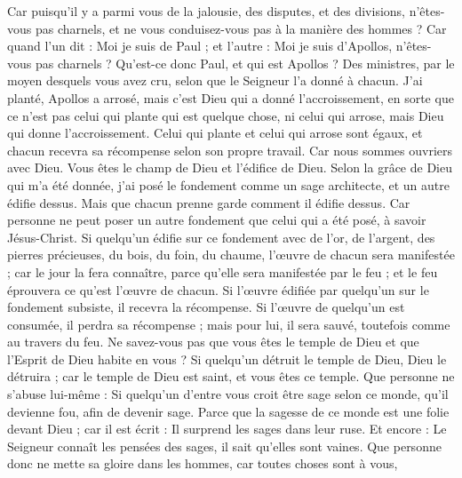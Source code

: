 \begin{multicols}{2}
Car puisqu'il y a parmi vous de la jalousie, des disputes, et des divisions, n'êtes-vous pas charnels, et ne vous conduisez-vous pas à la manière des hommes ?
Car quand l'un dit : Moi je suis de Paul ; et l'autre : Moi je suis d'Apollos, n'êtes-vous pas charnels ?
Qu’est-ce donc Paul, et qui est Apollos ? Des ministres, par le moyen desquels vous avez cru, selon que le Seigneur l’a donné à chacun.
J'ai planté, Apollos a arrosé, mais c'est Dieu qui a donné l'accroissement,
en sorte que ce n’est pas celui qui plante qui est quelque chose, ni celui qui arrose, mais Dieu qui donne l'accroissement.
Celui qui plante et celui qui arrose sont égaux, et chacun recevra sa récompense selon son propre travail.
Car nous sommes ouvriers avec Dieu. Vous êtes le champ de Dieu et l'édifice de Dieu.
Selon la grâce de Dieu qui m'a été donnée, j'ai posé le fondement comme un sage architecte, et un autre édifie dessus. Mais que chacun prenne garde comment il édifie dessus.
Car personne ne peut poser un autre fondement que celui qui a été posé, à savoir Jésus-Christ.
Si quelqu'un édifie sur ce fondement avec de l'or, de l'argent, des pierres précieuses, du bois, du foin, du chaume, l’œuvre de chacun sera manifestée ;
car le jour la fera connaître, parce qu'elle sera manifestée par le feu ; et le feu éprouvera ce qu’est l’œuvre de chacun.
Si l’œuvre édifiée par quelqu’un sur le fondement subsiste, il recevra la récompense.
Si l’œuvre de quelqu'un est consumée, il perdra sa récompense ; mais pour lui, il sera sauvé, toutefois comme au travers du feu.
Ne savez-vous pas que vous êtes le temple de Dieu et que l’Esprit de Dieu habite en vous ?
Si quelqu'un détruit le temple de Dieu, Dieu le détruira ; car le temple de Dieu est saint, et vous êtes ce temple.
Que personne ne s'abuse lui-même : Si quelqu'un d'entre vous croit être sage selon ce monde, qu'il devienne fou, afin de devenir sage.
Parce que la sagesse de ce monde est une folie devant Dieu ; car il est écrit : Il surprend les sages dans leur ruse.
Et encore : Le Seigneur connaît les pensées des sages, il sait qu’elles sont vaines.
Que personne donc ne mette sa gloire dans les hommes, car toutes choses sont à vous,

\end{multicols}
